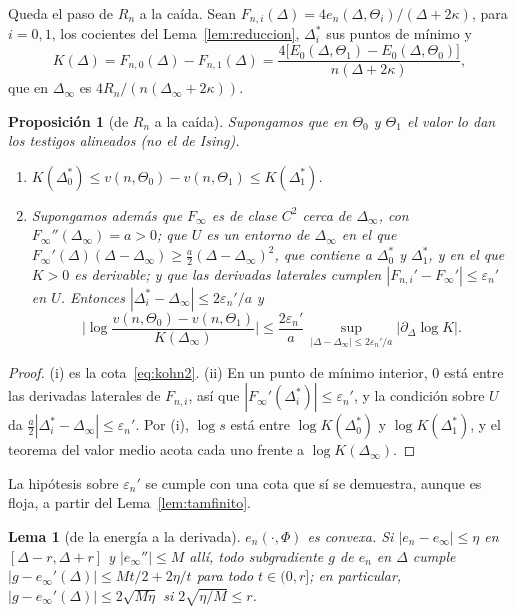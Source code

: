 \documentclass[11pt,a4paper]{article}
\newtheorem{lema}[teorema]{Lema}
\newtheorem{proposicion}[teorema]{Proposición}
\theoremstyle{remark}
\begin{document}
Queda el paso de $R_n$ a la caída. Sean $F_{n,i}(\Delta)=4e_n(\Delta,\Theta_i)/(\Delta+2\kappa)$, para
$i=0,1$, los cocientes del Lema~\ref{lem:reduccion}, $\Delta^\ast_i$ sus puntos de mínimo y
\[
  K(\Delta)=F_{n,0}(\Delta)-F_{n,1}(\Delta)=\frac{4\big[E_0(\Delta,\Theta_1)-E_0(\Delta,\Theta_0)\big]}{n(\Delta+2\kappa)},
\]
que en $\Delta_\infty$ es $4R_n/(n(\Delta_\infty+2\kappa))$.

\begin{proposicion}[de $R_n$ a la caída]\label{prop:paso}
Supongamos que en $\Theta_0$ y $\Theta_1$ el valor lo dan los testigos alineados (no el de Ising).
\begin{enumerate}
\item[(i)] $K(\Delta^\ast_0)\le v(n,\Theta_0)-v(n,\Theta_1)\le K(\Delta^\ast_1)$.
\item[(ii)] Supongamos además que $F_\infty$ es de clase $C^2$ cerca de $\Delta_\infty$, con
  $F_\infty''(\Delta_\infty)=a>0$; que $U$ es un entorno de $\Delta_\infty$ en el que
  $F_\infty'(\Delta)(\Delta-\Delta_\infty)\ge\tfrac a2(\Delta-\Delta_\infty)^2$, que contiene a
  $\Delta^\ast_0$ y $\Delta^\ast_1$, y en el que $K>0$ es derivable; y que las derivadas laterales
  cumplen $|F_{n,i}'-F_\infty'|\le\varepsilon_n'$ en $U$. Entonces
  $|\Delta^\ast_i-\Delta_\infty|\le2\varepsilon_n'/a$ y
  \[
    \Big|\log\frac{v(n,\Theta_0)-v(n,\Theta_1)}{K(\Delta_\infty)}\Big|\le\frac{2\varepsilon_n'}a\,
    \sup_{|\Delta-\Delta_\infty|\le2\varepsilon_n'/a}\big|\partial_\Delta\log K\big|.
  \]
\end{enumerate}
\end{proposicion}

\begin{proof}
(i) es la cota~\eqref{eq:kohn2}. (ii) En un punto de mínimo interior, $0$ está entre las derivadas
laterales de $F_{n,i}$, así que $|F_\infty'(\Delta^\ast_i)|\le\varepsilon_n'$, y la condición sobre
$U$ da $\tfrac a2|\Delta^\ast_i-\Delta_\infty|\le\varepsilon_n'$. Por (i), $\log s$ está entre
$\log K(\Delta^\ast_0)$ y $\log K(\Delta^\ast_1)$, y el teorema del valor medio acota cada uno frente a
$\log K(\Delta_\infty)$.
\end{proof}

La hipótesis sobre $\varepsilon_n'$ se cumple con una cota que sí se demuestra, aunque es floja,
a partir del Lema~\ref{lem:tamfinito}.

\begin{lema}[de la energía a la derivada]\label{lem:convexa}
$e_n(\cdot,\Phi)$ es convexa. Si $|e_n-e_\infty|\le\eta$ en $[\Delta-r,\Delta+r]$ y $|e_\infty''|\le M$
allí, todo subgradiente $g$ de $e_n$ en $\Delta$ cumple $|g-e_\infty'(\Delta)|\le Mt/2+2\eta/t$ para todo
$t\in(0,r]$; en particular, $|g-e_\infty'(\Delta)|\le2\sqrt{M\eta}$ si $2\sqrt{\eta/M}\le r$.
\end{lema}
\end{document}
